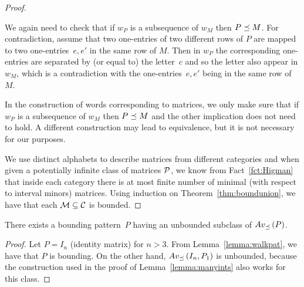 \begin{proof}
\begin{itemize}
	We again need to check that if $w_P$ is a subsequence of $w_M$ then $P\preceq M$. For contradiction, assume that two one-entries of two different rows of $P$ are mapped to two one-entries~$e,e'$ in the same row of $M$. Then in $w_P$ the corresponding one-entries are separated by (or equal to) the letter~$c$ and so the letter also appear in $w_M$, which is a contradiction with the one-entries~$e,e'$ being in the same row of $M$.
\end{itemize}

In the construction of words corresponding to matrices, we only make sure that if $w_P$ is a subsequence of $w_M$ then $P\preceq M$ and the other implication does not need to hold. A different construction may lead to equivalence, but it is not necessary for our purposes.

We use distinct alphabets to describe matrices from different categories and when given a potentially infinite class of matrices $\mathcal{P}$, we know from Fact~\ref{fct:Higman} that inside each category there is at most finite number of minimal (with respect to interval minors) matrices. Using induction on Theorem~\ref{thm:boundunion}, we have that each $\mathcal{M}\subseteq\mathcal{C}$ is bounded.
\end{proof}

\begin{obs}
There exists a bounding pattern~$P$ having an unbounded subclass of $Av_{\preceq}\left(P\right)$.
\end{obs}
\begin{proof}
Let $P=I_n$ (identity matrix) for $n>3$. From Lemma~\ref{lemma:walkpat}, we have that $P$ is bounding. On the other hand, $Av_{\preceq}\left(I_n,P_1\right)$ is unbounded, because the construction used in the proof of Lemma~\ref{lemma:manyints} also works for this class.
\end{proof}

